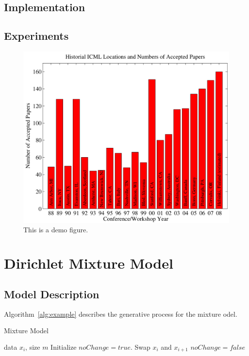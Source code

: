 \documentclass{article}
\begin{document}
\subsection{Implementation} 
\subsection{Experiments} 

\begin{figure}[ht]
\vskip 0.2in
\begin{center}
\centerline{\includegraphics[width=\columnwidth]{figs/examplegraph}}
\caption{This is a demo figure.}
\label{alabel}
\end{center}
\vskip -0.2in
\end{figure} 





\section{Dirichlet Mixture Model} 
\label{mmsec}
\subsection{Model Description} 
    Algorithm~\ref{alg:example} describes the generative process for the mixture odel.

    \begin{algorithm}[tb]
       \caption{Mixture Model}
       \label{alg:example}
    \begin{algorithmic}
        data $x_i$, size $m$
       \REPEAT
       \STATE Initialize $noChange = true$.
       \STATE Swap $x_i$ and $x_{i+1}$
       \STATE $noChange = false$
       \ENDIF
       \ENDFOR
    \end{algorithmic}
    \end{algorithm}
\end{document}

